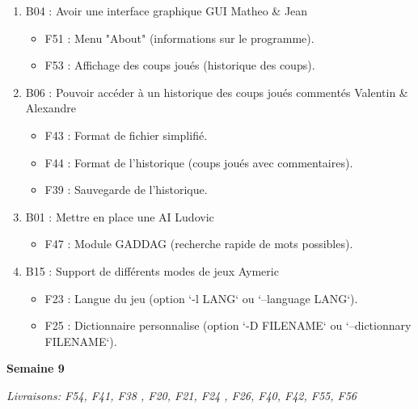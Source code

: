 \documentclass[a4paper,12pt]{article}
\begin{document}
\begin{enumerate}
\item B04 : Avoir une interface graphique GUI\newline
Matheo \& Jean
  \begin{itemize}
    \item F51 : Menu "About" (informations sur le programme).
    \item F53 : Affichage des coups joués (historique des coups).
  \end{itemize}
\item B06 : Pouvoir accéder à un historique des coups joués commentés\newline
Valentin \& Alexandre
  \begin{itemize}
    \item F43 : Format de fichier simplifié.
    \item F44 : Format de l’historique (coups joués avec commentaires).
    \item F39 : Sauvegarde de l’historique.
  \end{itemize}
\item B01 : Mettre en place une AI\newline
Ludovic
  \begin{itemize}
    \item F47 : Module GADDAG (recherche rapide de mots possibles).
  \end{itemize}
\item B15 : Support de différents modes de jeux\newline
Aymeric
  \begin{itemize}
    \item F23 : Langue du jeu (option `-l LANG` ou `--language LANG`). 
    \item F25 : Dictionnaire personnalise (option `-D FILENAME` ou `--dictionnary FILENAME`).\newline
  \end{itemize}
\end{enumerate}

\textbf{\large{Semaine 9}}

\textit{Livraisons: F54, F41, F38 , F20, F21, F24 , F26, F40, F42, F55, F56}
\end{document}
